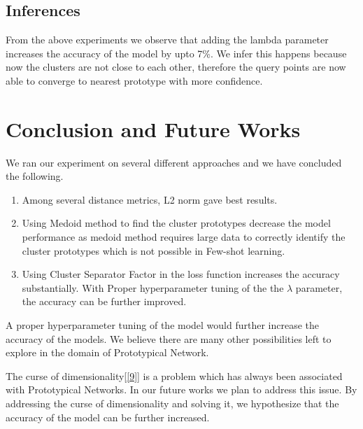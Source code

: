 \subsection{Inferences}
From the above experiments we observe that adding the lambda parameter increases the accuracy of the model by upto 7\%. We infer this happens because now the clusters are not close to each other, therefore the query points are now able to converge to nearest prototype with more confidence.

\newpage

\section{Conclusion and Future Works}
We ran our experiment on several different approaches and we have concluded the following.
\begin{enumerate}
\item Among several distance metrics, L2 norm gave best results.
\item Using Medoid method to find the cluster prototypes decrease the model performance as medoid method requires large data to correctly identify the cluster prototypes which is not possible in Few-shot learning.
\item Using Cluster Separator Factor in the loss function increases the accuracy substantially. With Proper hyperparameter tuning of the the \(\lambda\) parameter, the accuracy can be further improved.
\end{enumerate}
A proper hyperparameter tuning of the model would further increase the accuracy of the models. We believe there are many other possibilities left to explore in the domain of Prototypical Network. 

The curse of dimensionality[\ref{9}] is a problem which has always been associated with Prototypical Networks. In our future works we plan to address this issue. By addressing the curse of dimensionality and solving it, we hypothesize that the accuracy of the model can be further increased.





\newpage

